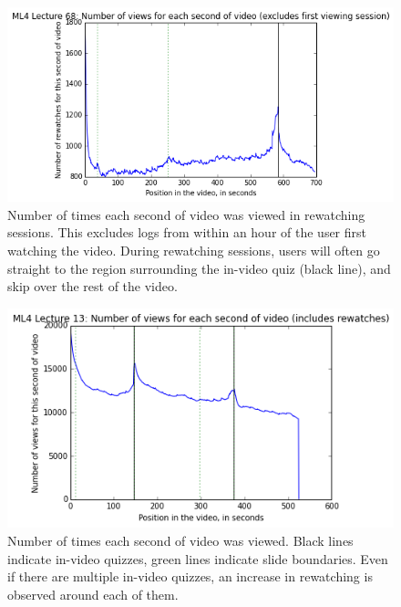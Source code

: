 \documentclass{sigchi}
\begin{document}
\begin{figure}
\includegraphics[width=1.0\columnwidth]{rewatchingsessions}
\caption{Number of times each second of video was viewed in rewatching sessions. This excludes logs from within an hour of the user first watching the video. During rewatching sessions, users will often go straight to the region surrounding the in-video quiz (black line), and skip over the rest of the video.}
\label{fig:rewatchingsessions}
\end{figure}

\begin{figure}
\includegraphics[width=1.0\columnwidth]{watched13}
\caption{Number of times each second of video was viewed. Black lines indicate in-video quizzes, green lines indicate slide boundaries. Even if there are multiple in-video quizzes, an increase in rewatching is observed around each of them.}
\label{fig:watched13}
\end{figure}
\end{document}
